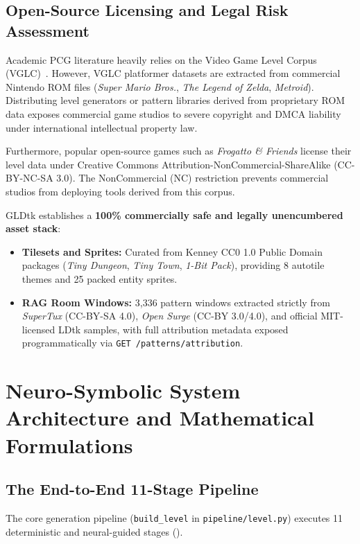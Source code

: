 \documentclass[11pt,a4paper]{report}
\theoremstyle{definition}
\theoremstyle{remark}
\begin{document}
\section{Open-Source Licensing and Legal Risk Assessment}
Academic PCG literature heavily relies on the Video Game Level Corpus (VGLC)~\citep{summerville2016vglc}. However, VGLC platformer datasets are extracted from commercial Nintendo ROM files (\emph{Super Mario Bros.}, \emph{The Legend of Zelda}, \emph{Metroid}). Distributing level generators or pattern libraries derived from proprietary ROM data exposes commercial game studios to severe copyright and DMCA liability under international intellectual property law.

Furthermore, popular open-source games such as \emph{Frogatto \& Friends} license their level data under Creative Commons Attribution-NonCommercial-ShareAlike (CC-BY-NC-SA 3.0). The NonCommercial (NC) restriction prevents commercial studios from deploying tools derived from this corpus.

GLDtk establishes a \textbf{100\% commercially safe and legally unencumbered asset stack}:
\begin{itemize}
    \item \textbf{Tilesets and Sprites:} Curated from Kenney CC0 1.0 Public Domain packages (\emph{Tiny Dungeon}, \emph{Tiny Town}, \emph{1-Bit Pack}), providing 8 autotile themes and 25 packed entity sprites.
    \item \textbf{RAG Room Windows:} 3,336 pattern windows extracted strictly from \emph{SuperTux} (CC-BY-SA 4.0), \emph{Open Surge} (CC-BY 3.0/4.0), and official MIT-licensed LDtk samples, with full attribution metadata exposed programmatically via \texttt{GET /patterns/attribution}.
\end{itemize}

\chapter{Neuro-Symbolic System Architecture and Mathematical Formulations}
\label{chap:arch}

\section{The End-to-End 11-Stage Pipeline}
The core generation pipeline (\texttt{build\_level} in \texttt{pipeline/level.py}) executes 11 deterministic and neural-guided stages ().
\end{document}
